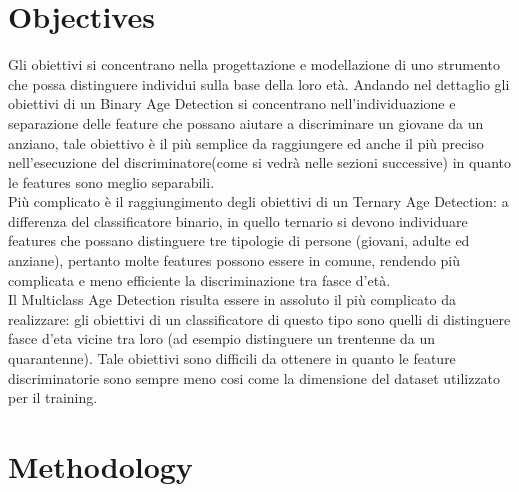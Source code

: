 \documentclass[12pt]{IEEEtran}
\begin{document}
\section{Objectives}
Gli obiettivi si concentrano nella progettazione e modellazione di uno strumento che possa distinguere individui sulla base della loro età. Andando nel dettaglio gli obiettivi di un Binary Age Detection si concentrano nell'individuazione e separazione delle feature che possano aiutare a discriminare un giovane da un anziano, tale obiettivo è il più semplice da raggiungere ed anche il più preciso nell'esecuzione del discriminatore(come si vedrà nelle sezioni successive) in quanto le features sono meglio separabili.\\
Più complicato è il raggiungimento degli obiettivi di un Ternary Age Detection: a differenza del classificatore binario, in quello ternario si devono individuare features che possano distinguere tre tipologie di persone (giovani, adulte ed anziane), pertanto molte features possono essere in comune, rendendo più complicata e meno efficiente la discriminazione tra fasce d'età.\\
Il Multiclass Age Detection risulta essere in assoluto il più complicato da realizzare: gli obiettivi di un classificatore di questo tipo sono quelli di distinguere fasce d'eta vicine tra loro (ad esempio distinguere un trentenne da un quarantenne). Tale obiettivi sono difficili da ottenere in quanto le feature discriminatorie sono sempre meno cosi come la dimensione del dataset utilizzato per il training. \\ 

\section{Methodology}
\end{document}
